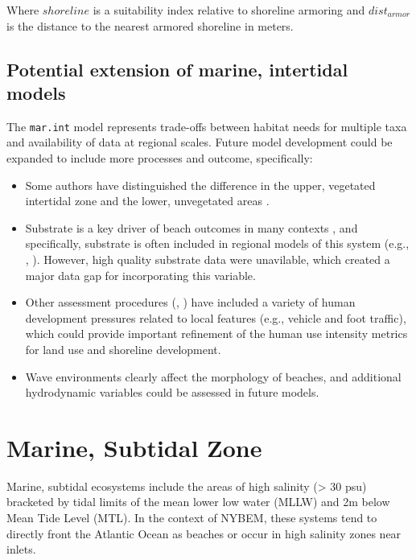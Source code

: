 \documentclass[
]{book}
\providecommand{\tightlist}{%
  \setlength{\itemsep}{0pt}\setlength{\parskip}{0pt}}
\begin{document}
Where \(shoreline\) is a suitability index relative to shoreline armoring and \(dist_{armor}\) is the distance to the nearest armored shoreline in meters.

\hypertarget{potential-extension-of-marine-intertidal-models}{%
\subsection{Potential extension of marine, intertidal models}\label{potential-extension-of-marine-intertidal-models}}

The \texttt{mar.int} model represents trade-offs between habitat needs for multiple taxa and availability of data at regional scales. Future model development could be expanded to include more processes and outcome, specifically:

\begin{itemize}
\tightlist
\item
  Some authors have distinguished the difference in the upper, vegetated intertidal zone and the lower, unvegetated areas \citep{usace_evaluation_2009}.\\
\item
  Substrate is a key driver of beach outcomes in many contexts \citep{lodder_chapter_2021}, and specifically, substrate is often included in regional models of this system (e.g., \citet{brady_habitat_1996}, \citet{avissar_modeling_2006}). However, high quality substrate data were unavilable, which created a major data gap for incorporating this variable.\\
\item
  Other assessment procedures (\citet{farmer_habitat_2000}, \citet{usace_evaluation_2009}) have included a variety of human development pressures related to local features (e.g., vehicle and foot traffic), which could provide important refinement of the human use intensity metrics for land use and shoreline development.\\
\item
  Wave environments clearly affect the morphology of beaches, and additional hydrodynamic variables could be assessed in future models.
\end{itemize}

\hypertarget{marine-subtidal-zone}{%
\section{Marine, Subtidal Zone}\label{marine-subtidal-zone}}

Marine, subtidal ecosystems include the areas of high salinity (\textgreater{} 30 psu) bracketed by tidal limits of the mean lower low water (MLLW) and 2m below Mean Tide Level (MTL). In the context of NYBEM, these systems tend to directly front the Atlantic Ocean as beaches or occur in high salinity zones near inlets.
\end{document}
